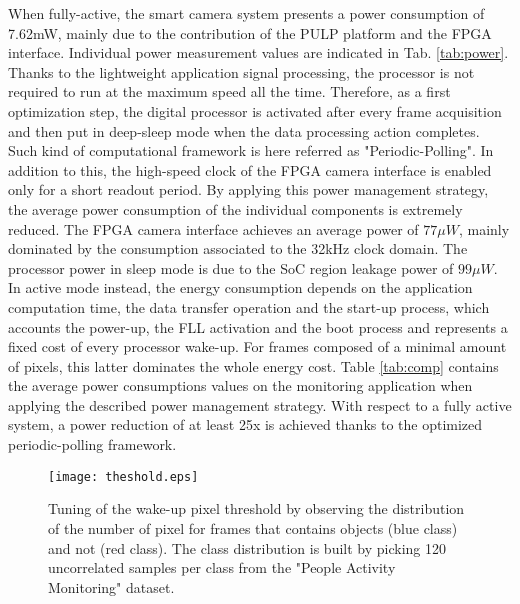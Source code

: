 \documentclass[journal]{IEEEtran}
\begin{document}
When fully-active, the smart camera system presents a power consumption of 7.62mW, mainly due to the contribution of the PULP platform and the FPGA interface. Individual power measurement values are indicated in Tab. \ref{tab:power}. Thanks to the lightweight application signal processing, the processor is not required to run at the maximum speed all the time. Therefore, as a first optimization step, the digital processor is activated after every frame acquisition and then put in deep-sleep mode when the data processing action completes. Such kind of computational framework is here referred as "Periodic-Polling". In addition to this, the high-speed clock of the FPGA camera interface is enabled only for a short readout period. By applying this power management strategy, the average power consumption of the individual components is extremely reduced. The FPGA camera interface achieves an average power of $77\mu W$, mainly dominated by the consumption associated to the 32kHz clock domain. The processor power in sleep mode is due to the SoC region leakage power of $99\mu W$. In active mode instead, the energy consumption depends on the application computation time, the data transfer operation and the start-up process, which accounts the power-up, the FLL activation and the boot process and represents a fixed cost of every processor wake-up. For frames composed of a minimal amount of pixels, this latter dominates the whole energy cost. 
Table \ref{tab:comp} contains the average power consumptions values on the monitoring application when applying the described power management strategy.
With respect to a fully active system, a power reduction of at least 25x is achieved thanks to the optimized periodic-polling framework. 


\begin{figure}[]
	\centering
  	\texttt{[image: theshold.eps]}
	\caption{Tuning of the wake-up pixel threshold by observing the distribution of the number of pixel for frames that contains objects (blue class) and not (red class). The class distribution is built by picking 120 uncorrelated samples per class from the "People Activity Monitoring" dataset. }
	\label{fig:thresh}       %
\end{figure}
\end{document}
